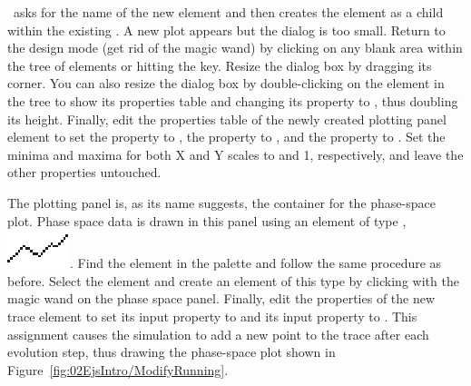 \ejs\ asks for the name of the new element and then creates the element as a child within the existing . A new plot appears but the dialog is too small.  Return to the design mode (get rid of the magic wand) by clicking on any blank area within the tree of elements or hitting the  key. Resize the dialog box by dragging its corner. You can also resize the dialog box by double-clicking on the  element in the tree to show its properties table and changing its  property to , thus doubling its height. Finally, edit the properties table of the newly created plotting panel element to set the  property to , the  property to , and the  property to . Set the minima and maxima for both X and Y scales to  and {1}, respectively, and leave the other properties untouched.

The plotting panel is, as its name suggests, the container for the phase-space plot. Phase space data is drawn in this panel using an element of type , \includegraphics[scale=\linescale]{images/Elements/Trace.eps}.  Find the  element in the  palette and follow the same procedure as before.  Select the  element and create an element of this type by clicking with the magic wand on the phase space panel. Finally, edit the properties of the new trace element to set its  input property to  and its  input property to . This assignment causes the simulation to add a new  point to the trace after each evolution step, thus drawing the phase-space plot shown in Figure~\ref{fig:02EjsIntro/ModifyRunning}.

